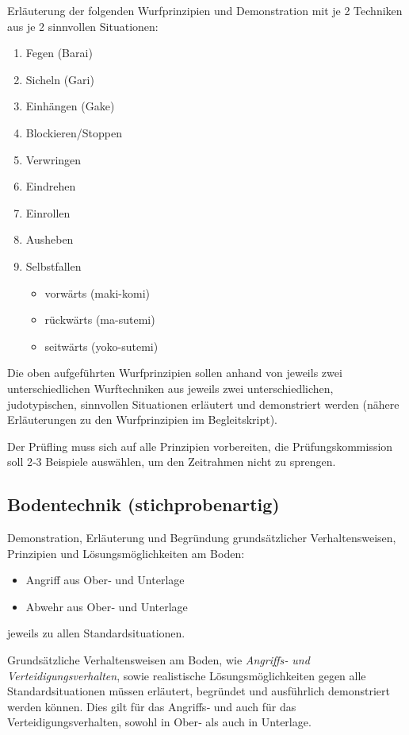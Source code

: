 \documentclass[justified, a4paper, notitlepage, captions=tableheading, nobib]{tufte-handout}
\begin{document}
Erläuterung der folgenden Wurfprinzipien und Demonstration mit je 2 Techniken aus je 2 sinnvollen Situationen:
\begin{enumerate}
\item Fegen (Barai)
\item Sicheln (Gari)
\item Einhängen (Gake)
\item Blockieren/Stoppen
\item Verwringen
\item Eindrehen
\item Einrollen
\item Ausheben
\item Selbstfallen
\begin{itemize}
\item vorwärts (maki-komi)
\item rückwärts (ma-sutemi)
\item seitwärts (yoko-sutemi)
\end{itemize}
\end{enumerate}

Die oben aufgeführten Wurfprinzipien sollen anhand von jeweils zwei unterschiedlichen Wurftechniken aus jeweils zwei unterschiedlichen, judotypischen, sinnvollen Situationen erläutert und demonstriert werden (nähere Erläuterungen zu den Wurfprinzipien im Begleitskript).

Der Prüfling muss sich auf alle Prinzipien vorbereiten, die Prüfungskommission soll 2‐3 Beispiele auswählen, um den Zeitrahmen nicht zu sprengen.

\subsection{Bodentechnik (stichprobenartig)}
\label{sec:org0c724dd}

Demonstration, Erläuterung und Begründung grundsätzlicher Verhaltensweisen, Prinzipien und Lösungsmöglichkeiten am Boden:
\begin{itemize}
\item Angriff aus Ober‐ und Unterlage
\item Abwehr aus Ober‐ und Unterlage
\end{itemize}
jeweils zu allen Standardsituationen.

Grundsätzliche Verhaltensweisen am Boden, wie \emph{Angriffs‐ und Verteidigungsverhalten}, sowie realistische Lösungsmöglichkeiten gegen alle Standardsituationen müssen erläutert, begründet und ausführlich demonstriert werden können. Dies gilt für das Angriffs‐ und auch für das Verteidigungsverhalten, sowohl in Ober‐ als auch in
Unterlage. 
\end{document}
